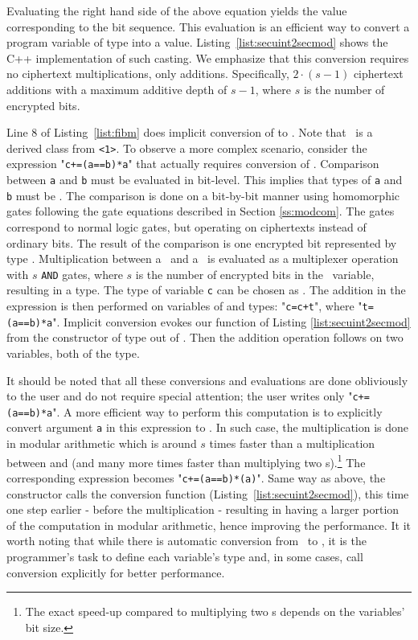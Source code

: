 Evaluating the right hand side of the above equation yields the value corresponding to the bit sequence. This evaluation is an efficient way to convert a program variable of type \secuint{} into a \secmod{} value.
Listing~\ref{list:secuint2secmod} shows the C++ implementation of such casting.
We emphasize that this conversion requires no ciphertext multiplications, only additions. Specifically, $2 \cdot (s - 1)$ ciphertext additions with a maximum additive depth of $s-1$, where $s$ is the number of encrypted bits.




Line 8 of Listing~\ref{list:fibm} does implicit conversion of \secbool{} to \secmod{}. Note that \secbool\ is a derived class from \secuint\texttt{<1>}. To observe a more complex scenario, consider the expression "{\tt{}c+=(a==b)*a}" that actually requires conversion of \secuint{}.
Comparison between \texttt{a} and \texttt{b} must be evaluated in bit-level. This implies that types of \texttt{a} and \texttt{b} must be \secuint{}. The comparison is done on a bit-by-bit manner using homomorphic gates following the gate equations described in Section \ref{ss:modcom}.
The gates correspond to normal logic gates, but operating on ciphertexts instead of ordinary bits. The result of the comparison is one encrypted bit represented by type \secbool.
Multiplication between a \secbool\ and a \secuint\ is evaluated as a multiplexer operation with $s$ \texttt{AND} gates, where $s$ is the number of encrypted bits in the \secuint\ variable, resulting in a \secuint{} type.
The type of variable \texttt{c} can be chosen as \secmod{}. The addition in the expression is then performed on variables of \secmod{} and \secuint{} types: "{\tt{}c=c+t}", where "{\tt{}t=(a==b)*a}". Implicit conversion evokes our function of Listing \ref{list:secuint2secmod} from the constructor of \secmod{} type out of \secuint{}.
Then the addition operation follows on two variables, both of the \secmod{} type.

It should be noted that all these conversions and evaluations are done obliviously to the user and do not require special attention; the user writes only "{\tt{}c+=(a==b)*a}".
A more efficient way to perform this computation is to explicitly convert argument \texttt{a}  in this expression to \secmod. In such case, the multiplication is done in modular arithmetic which is around $s$ times faster than a multiplication between \secbool{} and \secuint{} (and many more times faster than multiplying two \secuint{}s).\footnote{The exact speed-up compared to multiplying two \secuint s depends on the variables' bit size.} The corresponding expression becomes \mbox{"{\tt{}c+=(a==b)*\secmod(a)}"}.
Same way as above, the constructor calls the conversion function (Listing~\ref{list:secuint2secmod}), this time one step earlier - before the multiplication - resulting in having a larger portion of the computation in modular arithmetic, hence improving the performance.
It it worth noting that while there is automatic conversion from \secuint\ to \secmod, it is the programmer's task to define each variable's type and, in some cases, call conversion explicitly for better performance.
